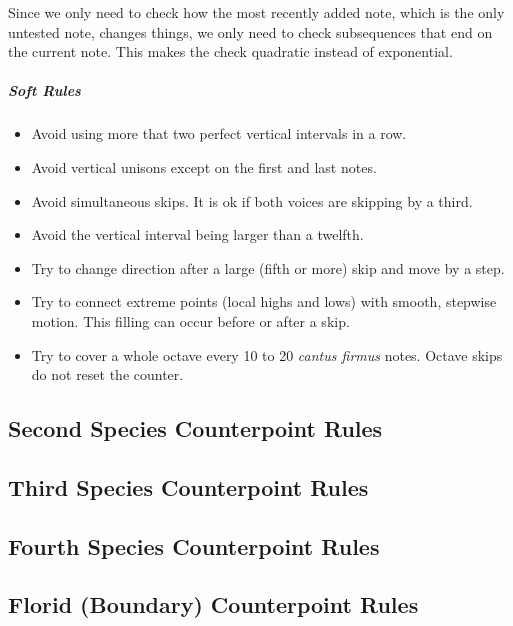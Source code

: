 \begin{enumerate}
					Since we only need to check how the most recently added note, which is the only untested note, changes things, we only need to check subsequences that end on the current note.
					This makes the check quadratic instead of exponential.
	\end{enumerate}
\subparagraph{Soft Rules}
	\begin{itemize}
		\item Avoid using more that two perfect vertical intervals in a row.
		\item Avoid vertical unisons except on the first and last notes.
		\item Avoid simultaneous skips. It is ok if both voices are skipping by a third.
		\item Avoid the vertical interval being larger than a twelfth.
		\item Try to change direction after a large (fifth or more) skip and move by a step.
		\item Try to connect extreme points (local highs and lows) with smooth, stepwise motion. This filling can occur before or after a skip.
		\item Try to cover a whole octave every 10 to 20 \emph{cantus firmus} notes. Octave skips do not reset the counter.
	\end{itemize}

\subsection{Second Species Counterpoint Rules}
\subsection{Third Species Counterpoint Rules}
\subsection{Fourth Species Counterpoint Rules}
\subsection{Florid (Boundary) Counterpoint Rules}
